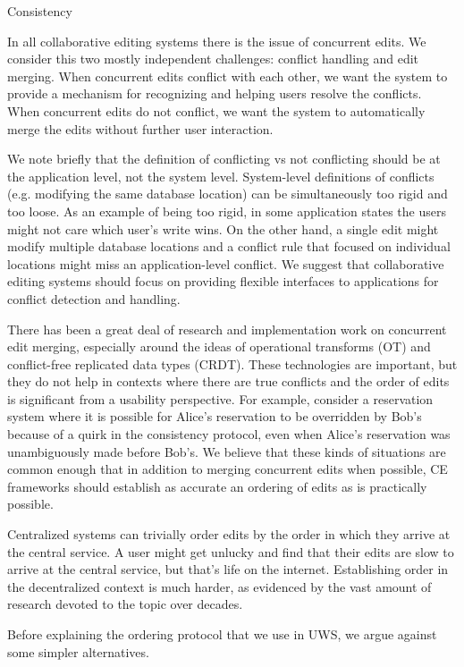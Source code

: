 \documentclass{article}
\begin{document}
Consistency

In all collaborative editing systems there is the issue of concurrent edits.
We consider this two mostly independent challenges: conflict handling and edit merging.
When concurrent edits conflict with each other, we want the system to provide a mechanism for recognizing and helping users resolve the conflicts.
When concurrent edits do not conflict, we want the system to automatically merge the edits without further user interaction.

We note briefly that the definition of conflicting vs not conflicting should be at the application level, not the system level.
System-level definitions of conflicts (e.g. modifying the same database location) can be simultaneously too rigid and too loose.
As an example of being too rigid, in some application states the users might not care which user's write wins.
On the other hand, a single edit might modify multiple database locations and a conflict rule that focused on individual locations might miss an application-level conflict.
We suggest that collaborative editing systems should focus on providing flexible interfaces to applications for conflict detection and handling.

There has been a great deal of research and implementation work on concurrent edit merging, especially around the ideas of operational transforms (OT) and conflict-free replicated data types (CRDT).
These technologies are important, but they do not help in contexts where there are true conflicts and the order of edits is significant from a usability perspective.
For example, consider a reservation system where it is possible for Alice's reservation to be overridden by Bob's because of a quirk in the consistency protocol, even when Alice's reservation was unambiguously made before Bob's.
We believe that these kinds of situations are common enough that in addition to merging concurrent edits when possible, CE frameworks should establish as accurate an ordering of edits as is practically possible.

Centralized systems can trivially order edits by the order in which they arrive at the central service.
A user might get unlucky and find that their edits are slow to arrive at the central service, but that's life on the internet.
Establishing order in the decentralized context is much harder, as evidenced by the vast amount of research devoted to the topic over decades.

Before explaining the ordering protocol that we use in UWS, we argue against some simpler alternatives.
\end{document}
